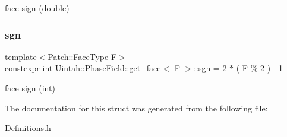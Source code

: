 face sign (double) 

\mbox{\label{structUintah_1_1PhaseField_1_1get__face_a55e98edca4379a745b28aa34f1d530a2}} 
\subsubsection{\texorpdfstring{sgn}{sgn}}
{\footnotesize\ttfamily template$<$Patch\+::\+Face\+Type F$>$ \\
constexpr int \hyperlink{structUintah_1_1PhaseField_1_1get__face}{Uintah\+::\+Phase\+Field\+::get\+\_\+face}$<$ F $>$\+::sgn = 2 $\ast$ ( F \% 2 ) -\/ 1\hspace{0.3cm}{\ttfamily [static]}}



face sign (int) 



The documentation for this struct was generated from the following file\+:\begin{DoxyCompactItemize}
\item 
\hyperlink{Definitions_8h}{Definitions.\+h}\end{DoxyCompactItemize}
